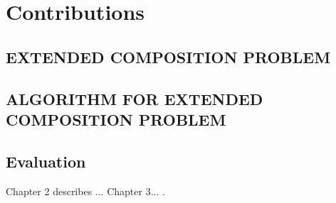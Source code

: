 \documentclass[senior,final,11pt]{iscs-thesis}
\begin{document}



\section{Contributions}

\subsection{EXTENDED COMPOSITION PROBLEM}
\subsection{ALGORITHM FOR EXTENDED COMPOSITION PROBLEM}
\subsection{Evaluation}
Chapter 2 describes ... Chapter 3...
\cite{4065825}. 
\end{document}
